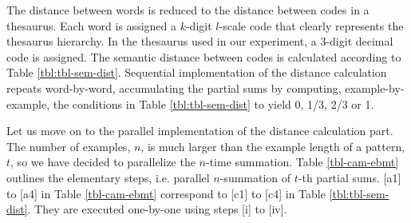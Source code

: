 The distance between words is reduced to the distance between codes in a 
thesaurus. 
Each word is assigned a $k$-digit $l$-scale code that clearly represents
the thesaurus hierarchy.
In the  thesaurus \cite{kado} used in our experiment, a 3-digit decimal
code is assigned.
The semantic distance between codes is calculated according to
Table \ref{tbl:tbl-sem-dist}.
Sequential implementation of the distance calculation  repeats
word-by-word, accumulating the partial sums by computing,
example-by-example, the conditions in Table \ref{tbl:tbl-sem-dist} to
yield 0, 1/3, 2/3 or 1.

Let us move on to the parallel implementation of the distance calculation part.
The number of examples, 
$n$, is much larger than the example length of a pattern, $t$,
so we have decided to parallelize the $n$-time summation.
Table \ref{tbl-cam-ebmt} outlines the elementary steps, i.e.
parallel $n$-summation of $t$-th partial sums.
[a1] to [a4] in Table \ref{tbl-cam-ebmt} correspond to [c1] to [c4]
in  Table \ref{tbl:tbl-sem-dist}. 
They are executed one-by-one  using steps  [i] to [iv].


